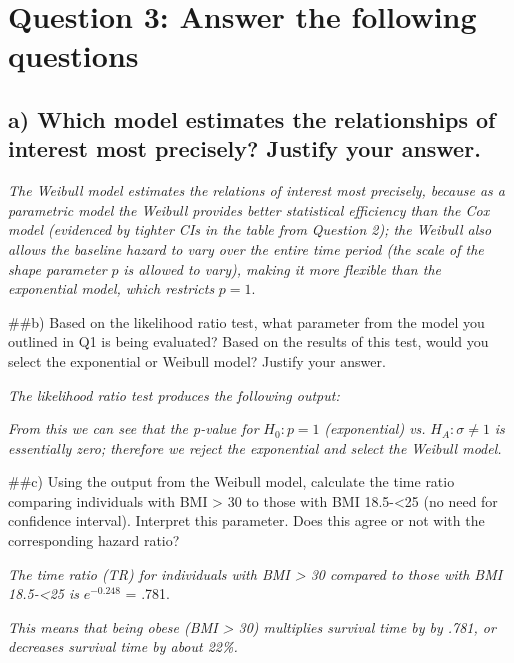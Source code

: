 \documentclass[]{article}
\begin{document}
\vspace{12pt}

\section{Question 3: Answer the following
questions}\label{question-3-answer-the-following-questions}

\subsection{a) Which model estimates the relationships of interest most
precisely? Justify your
answer.}\label{a-which-model-estimates-the-relationships-of-interest-most-precisely-justify-your-answer.}

\emph{The Weibull model estimates the relations of interest most
precisely, because as a parametric model the Weibull provides better
statistical efficiency than the Cox model (evidenced by tighter CIs in
the table from Question 2); the Weibull also allows the baseline hazard
to vary over the entire time period (the scale of the shape parameter}
\(p\) \emph{is allowed to vary), making it more flexible than the
exponential model, which restricts} \(p = 1\).

\vspace{6pt} \#\#b) Based on the likelihood ratio test, what parameter
from the model you outlined in Q1 is being evaluated? Based on the
results of this test, would you select the exponential or Weibull model?
Justify your answer.

\emph{The likelihood ratio test produces the following output:}

\emph{From this we can see that the p-value for} \(H_0 : p = 1\)
\emph{(exponential) vs.} \(H_A : \sigma \neq 1\) \emph{is essentially
zero; therefore we reject the exponential and select the Weibull model.}

\vspace{6pt} \#\#c) Using the output from the Weibull model, calculate
the time ratio comparing individuals with BMI \textgreater{} 30 to those
with BMI 18.5-\textless{}25 (no need for confidence interval). Interpret
this parameter. Does this agree or not with the corresponding hazard
ratio?

\emph{The time ratio (TR) for individuals with BMI \textgreater{} 30
compared to those with BMI 18.5-\textless{}25 is} \(e^{-0.248}\) = .781.

\emph{This means that being obese (BMI \textgreater{} 30) multiplies
survival time by by .781, or decreases survival time by about 22\%.}
\end{document}
